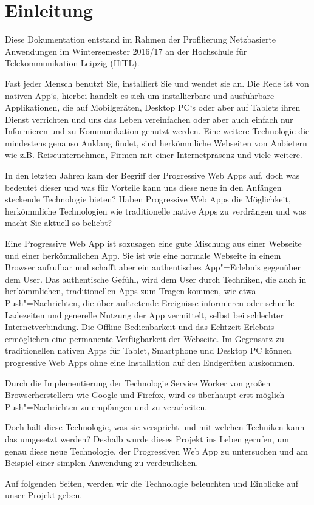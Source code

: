 \chapter{Einleitung}

Diese Dokumentation entstand im Rahmen der Profilierung \glqq Netzbasierte Anwendungen\grqq{} im Wintersemester 2016/17 an der Hochschule für Telekommunikation Leipzig (HfTL).

Fast jeder Mensch benutzt Sie, installiert Sie und wendet sie an. Die Rede ist von nativen App`s, hierbei handelt es sich um installierbare und ausführbare Applikationen, die auf Mobilgeräten, Desktop PC`s oder aber auf Tablets ihren Dienst verrichten und uns das Leben vereinfachen oder aber auch einfach nur Informieren und zu Kommunikation genutzt werden. Eine weitere Technologie die mindestens genauso Anklang findet, sind herkömmliche Webseiten von Anbietern wie z.B. Reiseunternehmen, Firmen mit einer Internetpräsenz und viele weitere.

In den letzten Jahren kam der Begriff der \glqq Progressive Web Apps\grqq{} auf, doch was bedeutet dieser und was für Vorteile kann uns diese neue in den Anfängen steckende Technologie bieten? Haben \glqq Progressive Web Apps\grqq{} die Möglichkeit, herkömmliche Technologien wie traditionelle native Apps zu verdrängen und was macht Sie aktuell so beliebt?

Eine Progressive Web App ist sozusagen eine gute Mischung aus einer Webseite und einer herkömmlichen App. Sie ist wie eine normale Webseite in einem Browser aufrufbar und schafft aber ein authentisches App"=Erlebnis gegenüber dem User. Das authentische Gefühl, wird dem User durch Techniken, die auch in herkömmlichen, traditionellen Apps zum Tragen kommen, wie etwa Push"=Nachrichten, die über auftretende Ereignisse informieren oder schnelle Ladezeiten und generelle Nutzung der App vermittelt, selbst bei schlechter Internetverbindung. Die Offline-Bedienbarkeit und das Echtzeit-Erlebnis ermöglichen eine permanente Verfügbarkeit der Webseite.  
Im Gegensatz zu traditionellen nativen Apps für Tablet, Smartphone und Desktop PC können progressive Web Apps ohne eine Installation auf den Endgeräten auskommen. 

Durch die Implementierung der Technologie \glqq Service Worker\grqq{} von großen Browserherstellern wie Google und Firefox, wird es überhaupt erst möglich Push"=Nachrichten zu empfangen und zu verarbeiten.

Doch hält diese Technologie, was sie verspricht und mit welchen Techniken kann das umgesetzt werden? Deshalb wurde dieses Projekt ins Leben gerufen, um genau diese neue Technologie, der \glqq Progressiven Web App\grqq{} zu untersuchen und am Beispiel einer simplen Anwendung zu verdeutlichen.

Auf folgenden Seiten, werden wir die Technologie beleuchten und Einblicke auf unser Projekt geben. 
